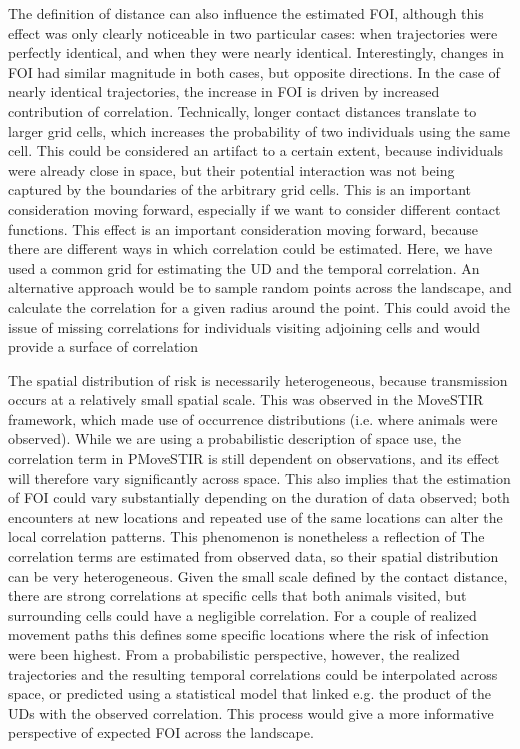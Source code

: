 \documentclass[letterpaper]{article}
\begin{document}
The definition of distance can also influence the estimated FOI, although this effect was only clearly noticeable in two particular cases: when trajectories were perfectly identical, and when they were nearly identical. Interestingly, changes in FOI had similar magnitude in both cases, but opposite directions. In the case of nearly identical trajectories, the increase in FOI is driven by increased contribution of correlation. Technically, longer contact distances translate to larger grid cells, which increases the probability of two individuals using the same cell. This could be considered an artifact to a certain extent, because individuals were already close in space, but their potential interaction was not being captured by the boundaries of the arbitrary grid cells. 
This is an important consideration moving forward, especially if we want to consider different contact functions. 
This effect is an important consideration moving forward, because there are different ways in which correlation could be estimated. Here, we have used a common grid for estimating the UD and the temporal correlation. An alternative approach would be to sample random points across the landscape, and calculate the correlation for a given radius around the point. This could avoid the issue of missing correlations for individuals visiting adjoining cells and would provide a surface of correlation

The spatial distribution of risk is necessarily heterogeneous, because transmission occurs at a relatively small spatial scale. This was observed in the MoveSTIR framework, which made use of occurrence distributions (i.e. where animals were observed). 
While we are using a probabilistic description of space use, the correlation term in PMoveSTIR is still dependent on observations, and its effect will therefore vary significantly across space. This also implies that the estimation of FOI could vary substantially depending on the duration of data observed; both encounters at new locations and repeated use of the same locations can alter the local correlation patterns. This phenomenon is nonetheless a reflection of 
The correlation terms are estimated from observed data, so their spatial distribution can be very heterogeneous. Given the small scale defined by the contact distance, there are strong correlations at  specific cells that both animals visited, but surrounding cells could have a negligible correlation. 
For a couple of realized movement paths this defines some specific locations where the risk of infection were been highest. From a probabilistic perspective, however, the realized trajectories and the resulting temporal correlations could be interpolated across space, or predicted using a statistical model that linked e.g. the product of the UDs with the observed correlation. This process would give a more informative perspective of expected FOI across the landscape. 
\end{document}
